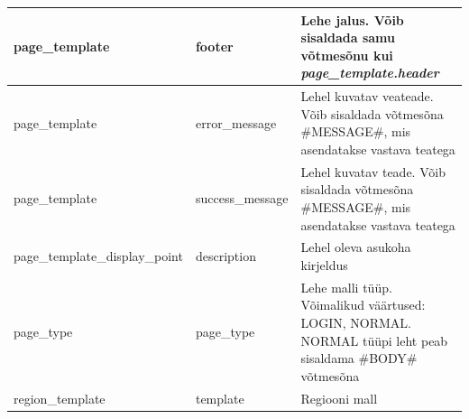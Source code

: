 \documentclass[a4paper,12pt]{article} %
\begin{document}
\begin{table}[H]
\begin{tabular}{|p{3cm}|p{3cm}|p{9cm}|}
page\_template & footer & Lehe jalus. Võib sisaldada samu võtmesõnu kui \textit{page\_template.header} \\ \hline
page\_template & error\_message & Lehel kuvatav veateade. Võib sisaldada võtmesõna \#MESSAGE\#, mis asendatakse vastava teatega \\ \hline
page\_template & success\_message & Lehel kuvatav teade. Võib sisaldada võtmesõna \#MESSAGE\#, mis asendatakse vastava teatega \\ \hline
page\_template\newline\_display\_point & description & Lehel oleva asukoha kirjeldus \\ \hline
page\_type & page\_type & Lehe malli tüüp. Võimalikud väärtused: LOGIN, NORMAL. NORMAL tüüpi leht peab sisaldama \#BODY\# võtmesõna \\ \hline
region\_template & template & Regiooni mall \\ \hline

\end{tabular}
\end{table}
\end{document}
